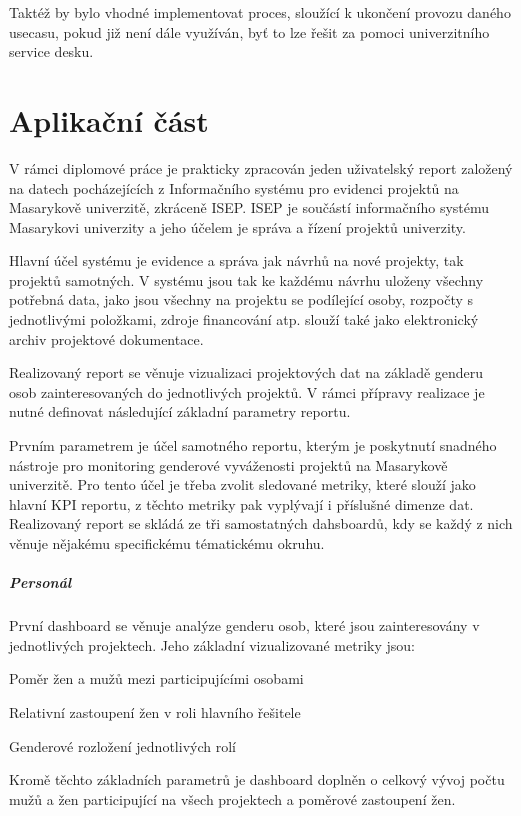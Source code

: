 \documentclass[
  digital,     %
  twoside,     %
  lof,         %
  lot,         %
]{fithesis4}
\begin{document}
Taktéž by bylo vhodné implementovat proces, sloužící k ukončení provozu daného usecasu, pokud již není dále využíván, byť to lze řešit za pomoci univerzitního service desku.



\chapter{Aplikační část}
V rámci diplomové práce je prakticky zpracován jeden uživatelský report založený na datech pocházejících z Informačního systému pro evidenci projektů na Masarykově univerzitě, zkráceně ISEP. ISEP je součástí informačního systému Masarykovi univerzity a jeho účelem je správa a řízení projektů univerzity. 

Hlavní účel systému je evidence a správa jak návrhů na nové projekty, tak projektů samotných. V systému jsou tak ke každému návrhu uloženy všechny potřebná data, jako jsou všechny na projektu se podílející osoby, rozpočty s jednotlivými položkami, zdroje financování atp. slouží také jako elektronický archiv projektové dokumentace.

Realizovaný report se věnuje vizualizaci projektových dat na základě genderu osob zainteresovaných do jednotlivých projektů. V rámci přípravy realizace je nutné definovat následující základní parametry reportu.

Prvním parametrem je účel samotného reportu, kterým je poskytnutí snadného nástroje pro monitoring genderové vyváženosti projektů na Masarykově univerzitě. Pro tento účel je třeba zvolit sledované metriky, které slouží jako hlavní KPI reportu, z těchto metriky pak vyplývají i příslušné dimenze dat. Realizovaný report se skládá ze tři samostatných dahsboardů, kdy se každý z nich věnuje nějakému specifickému tématickému okruhu. 
\paragraph{Personál} První dashboard se věnuje analýze genderu osob, které jsou zainteresovány v jednotlivých projektech. Jeho základní vizualizované metriky jsou: 
\begin{compactitem}
    \item Poměr žen a mužů mezi participujícími osobami
    \item Relativní zastoupení žen v roli hlavního řešitele
    \item Genderové rozložení jednotlivých rolí
\end{compactitem}
Kromě těchto základních parametrů je dashboard doplněn o celkový vývoj počtu mužů a žen participující na všech projektech a poměrové zastoupení žen.
\end{document}

